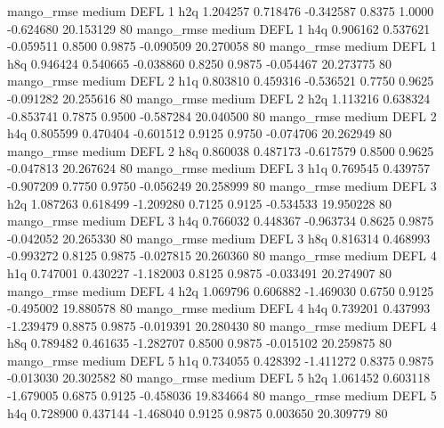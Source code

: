        mango_rmse     medium     DEFL                 1                  h2q  1.204257 0.718476 -0.342587 0.8375 1.0000 -0.624680   20.153129 80
       mango_rmse     medium     DEFL                 1                  h4q  0.906162 0.537621 -0.059511 0.8500 0.9875 -0.090509   20.270058 80
       mango_rmse     medium     DEFL                 1                  h8q  0.946424 0.540665 -0.038860 0.8250 0.9875 -0.054467   20.273775 80
       mango_rmse     medium     DEFL                 2                  h1q  0.803810 0.459316 -0.536521 0.7750 0.9625 -0.091282   20.255616 80
       mango_rmse     medium     DEFL                 2                  h2q  1.113216 0.638324 -0.853741 0.7875 0.9500 -0.587284   20.040500 80
       mango_rmse     medium     DEFL                 2                  h4q  0.805599 0.470404 -0.601512 0.9125 0.9750 -0.074706   20.262949 80
       mango_rmse     medium     DEFL                 2                  h8q  0.860038 0.487173 -0.617579 0.8500 0.9625 -0.047813   20.267624 80
       mango_rmse     medium     DEFL                 3                  h1q  0.769545 0.439757 -0.907209 0.7750 0.9750 -0.056249   20.258999 80
       mango_rmse     medium     DEFL                 3                  h2q  1.087263 0.618499 -1.209280 0.7125 0.9125 -0.534533   19.950228 80
       mango_rmse     medium     DEFL                 3                  h4q  0.766032 0.448367 -0.963734 0.8625 0.9875 -0.042052   20.265330 80
       mango_rmse     medium     DEFL                 3                  h8q  0.816314 0.468993 -0.993272 0.8125 0.9875 -0.027815   20.260360 80
       mango_rmse     medium     DEFL                 4                  h1q  0.747001 0.430227 -1.182003 0.8125 0.9875 -0.033491   20.274907 80
       mango_rmse     medium     DEFL                 4                  h2q  1.069796 0.606882 -1.469030 0.6750 0.9125 -0.495002   19.880578 80
       mango_rmse     medium     DEFL                 4                  h4q  0.739201 0.437993 -1.239479 0.8875 0.9875 -0.019391   20.280430 80
       mango_rmse     medium     DEFL                 4                  h8q  0.789482 0.461635 -1.282707 0.8500 0.9875 -0.015102   20.259875 80
       mango_rmse     medium     DEFL                 5                  h1q  0.734055 0.428392 -1.411272 0.8375 0.9875 -0.013030   20.302582 80
       mango_rmse     medium     DEFL                 5                  h2q  1.061452 0.603118 -1.679005 0.6875 0.9125 -0.458036   19.834664 80
       mango_rmse     medium     DEFL                 5                  h4q  0.728900 0.437144 -1.468040 0.9125 0.9875  0.003650   20.309779 80
